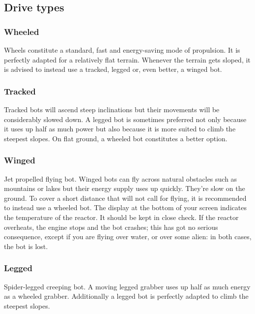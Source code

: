 
\subsection{Drive types}

\subsubsection{Wheeled}

Wheels constitute a standard, fast and energy-saving mode of propulsion. It is perfectly adapted for a relatively flat terrain. Whenever the terrain gets sloped, it is advised to instead use a tracked, legged or, even better, a winged bot.


\subsubsection{Tracked}

Tracked bots will ascend steep inclinations but their movements will be considerably slowed down. A legged bot is sometimes preferred not only because it uses up half as much power but also because it is more suited to climb the steepest slopes. On flat ground, a wheeled bot constitutes a better option.


\subsubsection{Winged}

Jet propelled flying bot. Winged bots can fly across natural obstacles such as mountains or lakes but their energy supply uses up quickly. They're slow on the ground. To cover a short distance that will not call for flying, it is recommended to instead use a wheeled bot. The display at the bottom of your screen indicates the temperature of the reactor. It should be kept in close check. If the reactor overheats, the engine stops and the bot crashes; this has got no serious consequence, except if you are flying over water, or over some alien: in both cases, the bot is lost.


\subsubsection{Legged}

Spider-legged creeping bot. A moving legged grabber uses up half as much energy as a wheeled grabber. Additionally a legged bot is perfectly adapted to climb the steepest slopes.
